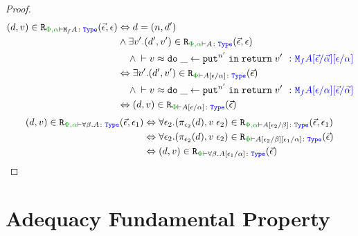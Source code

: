 \begin{framed}
\begin{proof}
            \begin{align*}
                \inLogRel{d}{v}{\P,\a}{\M{f}{A}}{\ev, \e} & \Leftrightarrow d= (n, d')
                \\ & \wedge \exists v'. \inLogRel{d'}{v'}{\P,\a}{A}{\ev, \e}
                \\ & \quad\wedge  \zberelation{v}{\doin{\_}{\put^{n'}}{\return{v'}}}{\M{f}{A}\ssub{\av}{\ev}\ssub{\a}{\e}}
                \\ & \Leftrightarrow \exists v'. \inLogRelPE{d'}{v'}{A\ssub{\a}{\e}}
                \\ & \quad\wedge  \zberelation{v}{\doin{\_}{\put^{n'}}{\return{v'}}}{\M{f}{A}\ssub{\a}{\e}\ssub{\av}{\ev}}
                \\ & \Leftrightarrow \inLogRelPE{d}{v}{A\ssub{\a}{\e}}
            \end{align*}
        \case{\tquant}
        \begin{align*}
            \inLogRel{d}{v}{\P,\a}{\all{\b}{A}}{\ev, \e_1} & \Leftrightarrow \forall \e_2. \inLogRel{\pi_{\e_2}(d)}{\eapp{v}{\e_2}}{\P,\a}{A\ssub{\b}{\e_2}}{\ev, \e_1}
            \\
            & \Leftrightarrow \forall \e_2. \inLogRelPE{\pi_{\e_2}(d)}{\eapp{v}{\e_2}}{A\ssub{\b}{\e_2}\ssub{\a}{\e_1}}
            \\
            & \Leftrightarrow \inLogRelPE{d}{v}{\all{\b}{A\ssub{\a}{\e_1}}}
        \end{align*}
        
    \end{proof}      
\end{framed}

\section{Adequacy Fundamental Property}
\label{AdequacyFundamentalPropertyProof}


